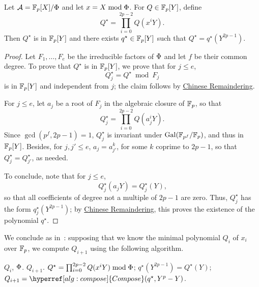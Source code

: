 \begin{lemma}
  \label{lemma:poly-cyclic}
  Let $\mathcal{A}=\mathbb{F}_p[X]/\Phi$ and let $x = X \bmod \Phi$. For
  $Q\in\mathbb{F}_p[Y]$, define 
  \begin{equation}
    Q^\star = \prod_{i=0}^{2p-2}Q(x^iY)
    \text{.}    
  \end{equation}
  Then $Q^\star$ is in $\mathbb{F}_p[Y]$ and there exists $q^\star\in\mathbb{F}_p[Y]$
  such that $Q^\star = q^\star(Y^{2p-1})$.
\end{lemma}
\begin{proof}
  Let $F_1,\dots,F_e$ be the irreducible factors of $\Phi$ and let
  $f$ be their common degree. To prove that $Q^\star$ is in $\mathbb{F}_p[Y]$,
  we prove that for $j \le e$, 
  \begin{equation}
    Q^\star_j = Q^\star \bmod F_j    
  \end{equation}
  is in $\mathbb{F}_p[Y]$ and independent from $j$; the claim follows by
  \hyperref[th:chinese-remainder]{Chinese Remaindering}.

  For $j \le e$, let $a_j$ be a root of $F_j$ in the algebraic closure
  of $\mathbb{F}_p$, so that
  \begin{equation}
    Q^\star_j = \prod_{i=0}^{2p-2}Q(a_j^iY)
    \text{.}
  \end{equation}
  Since $\gcd(p^f,2p-1)=1$, $Q^\star_j$ is invariant under
  $\operatorname{Gal}(\mathbb{F}_{p^f}/\mathbb{F}_p)$, and thus in $\mathbb{F}_p[Y]$. Besides, for
  $j,j'\le e$, $a_j = a_{j'}^k$, for some $k$ coprime to $2p-1$, so
  that $Q^\star_j= Q^\star_{j'}$, as needed.

  To conclude, note that for $j \le e$,
  \begin{equation}
    Q^\star_j(a_jY)=Q^\star_j(Y)
    \text{,}    
  \end{equation}
  so that all coefficients of degree not a multiple of $2p-1$ are
  zero.  Thus, $Q^\star_j$ has the form $q^\star_j(Y^{2p-1})$; by
  \hyperref[th:chinese-remainder]{Chinese Remaindering}, this proves
  the existence of the polynomial $q^\star$.
\end{proof}


We conclude as in~\cite{cantor89}: supposing that we know the minimal
polynomial $Q_i$ of $x_i$ over $\mathbb{F}_p$, we compute $Q_{i+1}$ using the
following algorithm.

\begin{algorithm}
  \caption{\label{alg:minimalpolynomial}}
  \begin{algorithmic}[1]
    \REQUIRE $Q_i$, $\Phi$.
    \ENSURE $Q_{i+1}$.
    \STATE \label{alg:minpol-Qstar}$Q^\star = \prod_{i=0}^{2p-2}Q(x^iY) \bmod \Phi$;
    \STATE \label{alg:minpol-qstar}$q^\star(Y^{2p-1}) = Q^\star(Y)$;
    \STATE \label{alg:minpol-Q}$Q_{i+1} = \hyperref[alg:compose]{\alg{Compose}}(q^\star,Y^p-Y)$.
  \end{algorithmic}
\end{algorithm}



